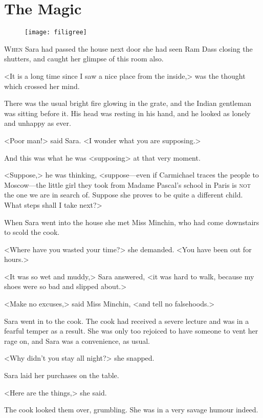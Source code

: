 \chapter{The Magic}

\begin{figure}[t!]
\centering
\texttt{[image: filigree]}
\end{figure}

\lettrine[lines=5]{W}{hen} Sara had passed the house next door she had seen Ram Dass closing the shutters, and caught her glimpse of this room also.

\zz
<It is a long time since I saw a nice place from the inside,> was the thought which crossed her mind.

\zz
There was the usual bright fire glowing in the grate, and the Indian gentleman was sitting before it. His head was resting in his hand, and he looked as lonely and unhappy as ever.

<Poor man!> said Sara. <I wonder what you are supposing.>

And this was what he was <supposing> at that very moment.

<Suppose,> he was thinking, <suppose—even if Carmichael traces the people to Moscow—the little girl they took from Madame Pascal's school in Paris is \textsc{not} the one we are in search of. Suppose she proves to be quite a different child. What steps shall I take next?>

When Sara went into the house she met Miss Minchin, who had come downstairs to scold the cook.

<Where have you wasted your time?> she demanded. <You have been out for hours.>

<It was so wet and muddy,> Sara answered, <it was hard to walk, because my shoes were so bad and slipped about.>

<Make no excuses,> said Miss Minchin, <and tell no falsehoods.>

Sara went in to the cook. The cook had received a severe lecture and was in a fearful temper as a result. She was only too rejoiced to have someone to vent her rage on, and Sara was a convenience, as usual.

<Why didn't you stay all night?> she snapped.

Sara laid her purchases on the table.

<Here are the things,> she said.

The cook looked them over, grumbling. She was in a very savage humour indeed.


